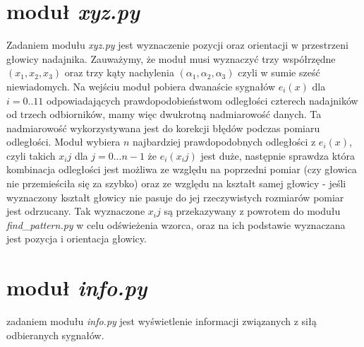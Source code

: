  
\section{moduł \textit{xyz.py}}

Zadaniem modułu \textit{xyz.py} jest wyznaczenie pozycji oraz orientacji w przestrzeni głowicy nadajnika.
Zauważymy, że moduł musi wyznaczyć trzy współrzędne $(x_1,x_2,x_3)$
oraz trzy kąty nachylenia $(\alpha_1, \alpha_2, \alpha_3)$ czyli w sumie sześć niewiadomych.
Na wejściu moduł pobiera dwanaście sygnałów $e_i(x)$ dla $i=0..11$ odpowiadających prawdopodobieństwom odległości
czterech nadajników od trzech odbiorników, mamy więc dwukrotną nadmiarowość danych.
Ta nadmiarowość wykorzystywana jest do korekcji błędów podczas pomiaru odległości.
Moduł wybiera $n$ najbardziej prawdopodobnych odległości z $e_i(x)$, czyli takich $x_ij$ dla $j = 0...n-1$
że $e_i(x_ij)$ jest duże, następnie sprawdza która kombinacja 
odległości jest możliwa ze względu na poprzedni pomiar (czy głowica nie przemieściła się za szybko)
oraz ze względu na kształt samej głowicy - jeśli wyznaczony kształt głowicy nie pasuje do jej rzeczywistych
rozmiarów pomiar jest odrzucany.
Tak wyznaczone $x_ij$ są przekazywany z powrotem do modułu \textit{find\_pattern.py} w celu odświeżenia wzorca,
oraz na ich podstawie wyznaczana jest pozycja i orientacja głowicy.

\section{moduł \textit{info.py}}

zadaniem modułu \textit{info.py} jest wyświetlenie informacji związanych z siłą odbieranych sygnałów.

